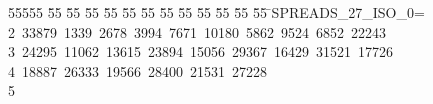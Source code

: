 %
%
\begin{tabbing}
55555 \= 55 \= 55 \= 55 \= 55 \= 55 \= 55 \= 55 \= 55 \= 55 \= 55 \= 55 \= 55 \= \>SPREADS\_27\_ISO\_0=\\[0pt]
2\ 33879\ 1339\ 2678\ 3994\ 7671\ 10180\ 5862\ 9524\ 6852\ 22243\ \\[0pt]
3\ 24295\ 11062\ 13615\ 23894\ 15056\ 29367\ 16429\ 31521\ 17726\ \\[0pt]
4\ 18887\ 26333\ 19566\ 28400\ 21531\ 27228\\[0pt]
5\>\end{tabbing}
